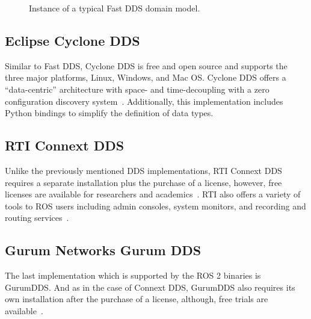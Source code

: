 \begin{figure}[htbp]
        \vspace{1em}
        \caption{Instance of a typical Fast \ac{DDS} domain model.}
        \label{fig:ddsdomain}
    \end{figure}

    \subsection{Eclipse Cyclone DDS}

        Similar to Fast \ac{DDS}, Cyclone \ac{DDS} is free and open source and supports the three major platforms, Linux, Windows, and Mac OS. Cyclone \ac{DDS} offers a ``data-centric'' architecture with space- and time-decoupling with a zero configuration discovery system~\cite{eclipse}. Additionally, this implementation includes Python bindings to simplify the definition of data types. 

    \subsection{RTI Connext DDS}

        Unlike the previously mentioned \ac{DDS} implementations, \ac{RTI} Connext DDS requires a separate installation plus the purchase of a license, however, free licenses are available for researchers and academics~\cite{connextuni}. \ac{RTI} also offers a variety of tools to \ac{ROS} users including admin consoles, system monitors, and recording and routing services~\cite{rtiblog}.

    \subsection{Gurum Networks Gurum DDS}

        The last implementation which is supported by the \ac{ROS} 2 binaries is GurumDDS. And as in the case of Connext DDS, GurumDDS also requires its own installation after the purchase of a license, although, free trials are available~\cite{gurum}. 


